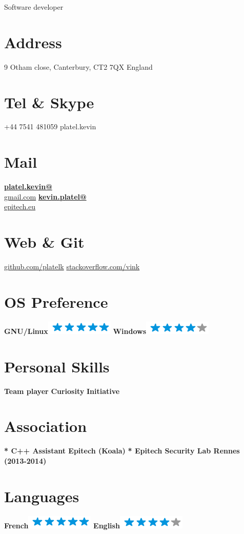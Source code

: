 \documentclass[]{friggeri-cv}
\begin{document}
      {Software developer}
      

\begin{aside}
  \section{Address}
    9 Otham close,
    Canterbury, CT2 7QX
    England
    ~
  \section{Tel \& Skype}
    +44 7541 481059
    platel.kevin
    ~
  \section{Mail}
    \href{mailto:platel.kevin@gmail.com}{\textbf{platel.kevin@}\\gmail.com}
    \href{mailto:kevin.platel@epitech.eu}{\textbf{kevin.platel@}\\epitech.eu}
    ~
  \section{Web \& Git}
    \href{https://github.com/platelk}{github.com/platelk}
    \href{http://stackoverflow.com/users/3676180/vink}{stackoverflow.com/vink}
    ~
  \section{OS Preference}
    \textbf{GNU/Linux}\includegraphics[scale=0.40]{img/5stars.png}
    \textbf{Windows}\includegraphics[scale=0.40]{img/4stars.png}
    ~
  \section{Personal Skills}
    \textbf{Team player}
    \textbf{Curiosity}
    \textbf{Initiative}
    ~
  \section{Association}
    \textbf{* C++ Assistant Epitech (Koala)}
    \textbf{* Epitech Security Lab Rennes (2013-2014)}
    ~
  \section{Languages}
  \textbf{French}\includegraphics[scale=0.40]{img/5stars.png}
  \textbf{English}\includegraphics[scale=0.40]{img/4stars.png}
\end{aside}
\end{document}
